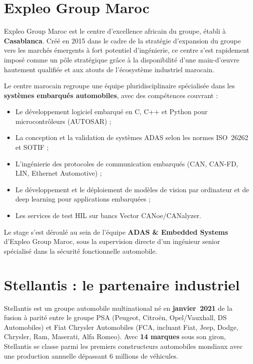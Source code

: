 \documentclass[12pt,a4paper]{report}
\begin{document}
\section{Expleo Group Maroc}

Expleo Group Maroc est le centre d'excellence africain du groupe, \'etabli \`a \textbf{Casablanca}. Cr\'e\'e en 2015 dans le cadre de la strat\'egie d'expansion du groupe vers les march\'es \'emergents \`a fort potentiel d'ing\'enierie, ce centre s'est rapidement impos\'e comme un p\^ole strat\'egique gr\^ace \`a la disponibilit\'e d'une main-d'\oe uvre hautement qualifi\'ee et aux atouts de l'\'ecosyst\`eme industriel marocain.

Le centre marocain regroupe une \'equipe pluridisciplinaire sp\'ecialis\'ee dans les \textbf{syst\`emes embarqu\'es automobiles}, avec des comp\'etences couvrant :
\begin{itemize}
  \item Le d\'eveloppement logiciel embarqu\'e en C, C++ et Python pour microcontr\^oleurs (AUTOSAR) ;
  \item La conception et la validation de syst\`emes ADAS selon les normes ISO~26262 et SOTIF ;
  \item L'ing\'enierie des protocoles de communication embarqu\'es (CAN, CAN-FD, LIN, Ethernet Automotive) ;
  \item Le d\'eveloppement et le d\'eploiement de mod\`eles de vision par ordinateur et de deep learning pour applications embarqu\'ees ;
  \item Les services de test HIL sur bancs Vector CANoe/CANalyzer.
\end{itemize}

Le stage s'est d\'eroul\'e au sein de l'\'equipe \textbf{ADAS \& Embedded Systems} d'Expleo Group Maroc, sous la supervision directe d'un ing\'enieur senior sp\'ecialis\'e dans la s\'ecurit\'e fonctionnelle automobile.

\section{Stellantis : le partenaire industriel}

Stellantis est un groupe automobile multinational n\'e en \textbf{janvier~2021} de la fusion \`a parit\'e entre le groupe PSA (Peugeot, Citro\"en, Opel/Vauxhall, DS Automobiles) et Fiat Chrysler Automobiles (FCA, incluant Fiat, Jeep, Dodge, Chrysler, Ram, Maserati, Alfa Romeo). Avec \textbf{14 marques} sous son giron, Stellantis se classe parmi les premiers constructeurs automobiles mondiaux avec une production annuelle d\'epassant 6 millions de v\'ehicules.
\end{document}
